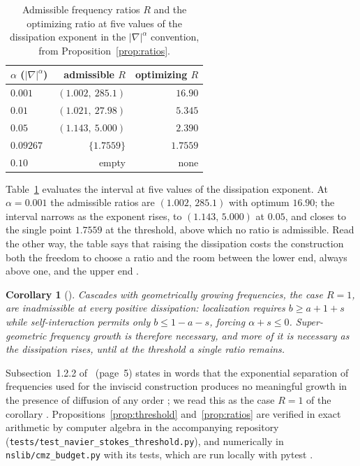 \documentclass[11pt]{article}
\newtheorem{corollary}[theorem]{Corollary}
\theoremstyle{remark}
\newcommand{\ev}[1]{\hspace{0.2em}{\small\textsf{[#1]}}}
\newcommand{\fp}[1]{\nolinkurl{#1}}
\begin{document}
\begin{table}[t]
\centering
\begin{tabular}{lrr}
\toprule
$\alpha$ ($|\nabla|^{\alpha}$) & admissible $R$ & optimizing $R$ \\
\midrule
$0.001$ & $(1.002,\ 285.1)$ & $16.90$ \\
$0.01$ & $(1.021,\ 27.98)$ & $5.345$ \\
$0.05$ & $(1.143,\ 5.000)$ & $2.390$ \\
$0.09267$ & $\{1.7559\}$ & $1.7559$ \\
$0.10$ & empty & none \\
\bottomrule
\end{tabular}
\caption{Admissible frequency ratios $R$ and the optimizing ratio at five values of the dissipation
exponent in the $|\nabla|^{\alpha}$ convention, from Proposition~\ref{prop:ratios}. \ev{MV}}\label{tab:ratios}
\end{table}

Table~\ref{tab:ratios} evaluates the interval at five values of the dissipation exponent. At $\alpha=0.001$ the
admissible ratios are $(1.002,\,285.1)$ with optimum $16.90$; the interval narrows as the exponent rises, to
$(1.143,\,5.000)$ at $0.05$, and closes to the single point $1.7559$ at the threshold, above which no ratio is
admissible. Read the other way, the table says that raising the dissipation costs the construction both the freedom
to choose a ratio and the room between the lower end, always above one, and the upper end \ev{MV}.

\begin{corollary}[\ev{D}]
Cascades with geometrically growing frequencies, the case $R=1$, are inadmissible at every positive
dissipation: localization requires $b\ge a+1+s$ while self-interaction permits only $b\le1-a-s$,
forcing $\alpha+s\le0$. Super-geometric frequency growth is therefore necessary, and more of it is
necessary as the dissipation rises, until at the threshold a single ratio remains.
\end{corollary}

Subsection~1.2.2 of~\cite{cmz} (page~5) states in words that the exponential separation of
frequencies used for the inviscid construction produces no meaningful growth in the presence of
diffusion of any order \ev{V}; we read this as the case $R=1$ of the corollary \ev{C}. Propositions~\ref{prop:threshold}
and~\ref{prop:ratios} are verified in exact arithmetic by computer
algebra in the accompanying repository (\fp{tests/test_navier_stokes_threshold.py}), and
numerically in \fp{nslib/cmz_budget.py} with its tests, which are run locally with pytest \ev{MV}.
\end{document}
